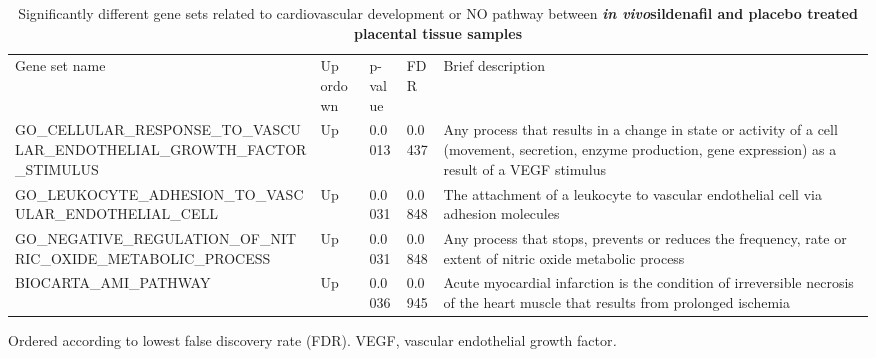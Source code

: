 \documentclass[authordate, empirical]{jote-new-article}
\begin{document}
	\begin{table}[h!]
        \begin{fullwidth}
        \caption{Significantly different gene sets related to cardiovascular development or NO pathway between \emph{\textbf{in vivo}}\textbf{sildenafil and placebo treated placental tissue samples}}

		\begin{tabularx}{\linewidth}{@{} X l l l X @{}}
			 Gene set name & Up ordown & p-value & FDR & Brief description \\

			 GO\_CELLULAR\_RESPONSE\_TO\_VASCULAR\_ENDOTHELIAL\_GROWTH\_FACTOR\_STIMULUS & Up &
			0.0013 & 0.0437 & Any process that results in a change in state or activity of a cell (movement, secretion, enzyme production, gene expression) as a result of a VEGF stimulus
			\\

			 GO\_LEUKOCYTE\_ADHESION\_TO\_VASCULAR\_ENDOTHELIAL\_CELL & Up & 0.0031 & 0.0848
			& The attachment of a leukocyte to vascular endothelial cell via adhesion molecules
			\\

			 GO\_NEGATIVE\_REGULATION\_OF\_NITRIC\_OXIDE\_METABOLIC\_PROCESS & Up & 0.0031 & 0.0848
			& Any process that stops, prevents or reduces the frequency, rate or extent of nitric oxide metabolic process
			\\

			 BIOCARTA\_AMI\_PATHWAY & Up & 0.0036 & 0.0945 & Acute myocardial infarction is the condition of irreversible necrosis of the heart muscle that results from prolonged ischemia
			\\


		\end{tabularx}
        Ordered according to lowest false discovery rate (FDR). VEGF, vascular endothelial growth factor\emph{.}
    \end{fullwidth}
	\end{table}
\end{document}
